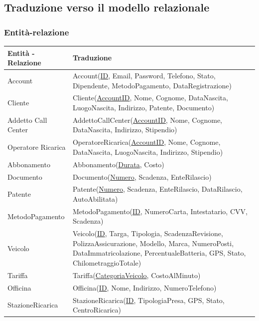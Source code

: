 \documentclass{article}
\begin{document}
\subsection{Traduzione verso il modello relazionale}

\subsubsection{Entità-relazione}


\begin{table}[H]
    \centering
    \begin{tabularx}{\textwidth}{|p{3.1cm}|X|}
    \hline
        \textbf{Entità - Relazione} & \textbf{Traduzione} \\ \hline
        Account & Account(\underline{ID}, Email, Password, Telefono, Stato, Dipendente, MetodoPagamento, DataRegistrazione) \\ \hline
        Cliente & Cliente(\underline{AccountID}, Nome, Cognome, DataNascita, LuogoNascita, Indirizzo, Patente, Documento)\\ \hline
        Addetto Call Center & AddettoCallCenter(\underline{AccountID}, Nome, Cognome, DataNascita, Indirizzo, Stipendio)\\ \hline 
        Operatore Ricarica & OperatoreRicarica(\underline{AccountID}, Nome, Cognome, DataNascita, LuogoNascita, Indirizzo, Stipendio)\\ \hline
        Abbonamento & Abbonamento(\underline{Durata}, Costo)\\ \hline
        Documento & Documento(\underline{Numero}, Scadenza, EnteRilascio)\\ \hline
        Patente & Patente(\underline{Numero}, Scadenza, EnteRilascio, DataRilascio, AutoAbilitata)  \\ \hline
        MetodoPagamento & MetodoPagamento(\underline{ID}, NumeroCarta, Intestatario, CVV, Scadenza) \\ \hline
        Veicolo & Veicolo(\underline{ID}, Targa, Tipologia, ScadenzaRevisione, PolizzaAssicurazione, Modello, Marca, NumeroPosti, DataImmatricolazione, PercentualeBatteria, GPS, Stato, ChilometraggioTotale)\\ \hline
        Tariffa & Tariffa(\underline{CategoriaVeicolo}, CostoAlMinuto)\\ \hline
        Officina & Officina(\underline{ID}, Nome, Indirizzo, NumeroTelefono) \\ \hline
        StazioneRicarica & StazioneRicarica(\underline{ID}, TipologiaPresa, GPS, Stato, CentroRicarica) \\ \hline

\end{tabularx}
\end{table}
\end{document}
